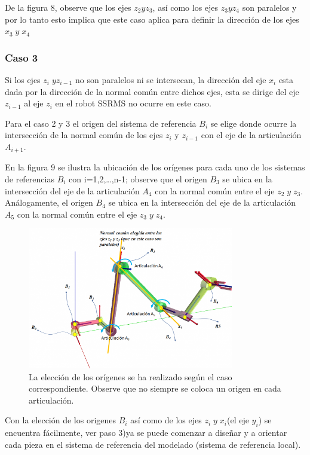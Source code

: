 \documentclass[12pt,a4paper]{report}
\begin{document}
De la figura 8, observe que los ejes $z_{2} y z_{3}$, así como los ejes $z_{3} y z_{4}$ son paralelos y por lo tanto esto implica que este caso aplica para definir  la dirección de los ejes $x_{3}\; y \;x_{4}$ 

\subsubsection{Caso 3}
Si los ejes $z_{i}\; y z_{i-1}$ no son paralelos ni se intersecan, la dirección del eje $x_{i}$ esta dada por la dirección de la normal común entre dichos ejes, esta  se dirige del eje $z_{i-1}$ al eje $z_{i}$ en el robot SSRMS no ocurre en este caso.

Para el caso 2 y 3 el origen del sistema de referencia $B_{i}$ se elige donde ocurre la intersección de la normal común de los ejes $z_{i}$ y $z_{i-1}$ con el eje  de la articulación $A_{i+1}$.

En la figura 9 se ilustra la ubicación de los orígenes para cada uno de los sistemas de referencias ${B_{i}}$ con i=1,2,…,n-1; observe que el origen $B_{3}$ se ubica en la intersección del eje de la articulación $A_{4}$ con la normal común entre el eje $z_{2} \;y\; z_{3}$. Análogamente, el origen $B_{4}$ se ubica en la intersección del eje de la articulación $A_{5}$ con la normal común entre el eje $z_{3}\;y \;z_{4}$.

\begin{figure}[hbtp]
\centering
\includegraphics[width=9cm]{9.png}
\caption{La elección de los orígenes se ha realizado según el caso correspondiente. Observe que no siempre se coloca un origen en cada articulación.}
\end{figure}

Con la elección de los origenes ${B_{i}}$ así como de los ejes $z_{i}\; y \; x_{i}$(el eje $y_{i}$) se encuentra fácilmente, ver paso 3)ya se puede comenzar a diseñar y a orientar cada pieza en el sistema de referencia del modelado (sistema de referencia local).
\end{document}
